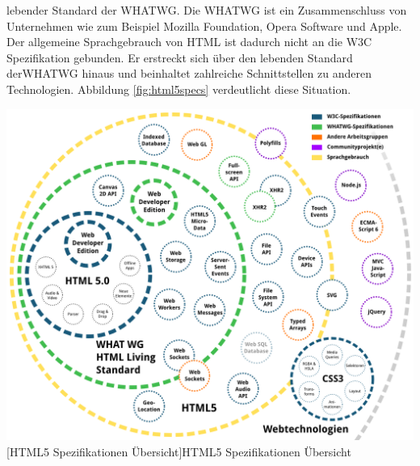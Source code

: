 \documentclass[12pt,a4paper,bibliography=totocnumbered,listof=totocnumbered]{scrartcl}
\begin{document}
lebender Standard\grqq{} der \ac{WHATWG}. Die \ac{WHATWG} ist ein Zusammenschluss von Unternehmen wie zum Beispiel Mozilla Foundation, Opera Software und Apple. Der allgemeine Sprachgebrauch von \ac{HTML} ist dadurch nicht an die \ac{W3C} Spezifikation gebunden. Er erstreckt sich über den \glqq lebenden Standard\grqq{} der\ac{WHATWG} hinaus und beinhaltet zahlreiche Schnittstellen zu anderen Technologien. Abbildung \ref{fig:html5specs} verdeutlicht diese Situation.

	\vspace{1em}
	\begin{minipage}{\linewidth}
		\centering
		\includegraphics[width=0.87\linewidth]{images/html5_specs.png}
		[HTML5 Spezifikationen Übersicht]{HTML5 Spezifikationen Übersicht}
		\label{fig:html5specs}
	\end{minipage}
\end{document}
